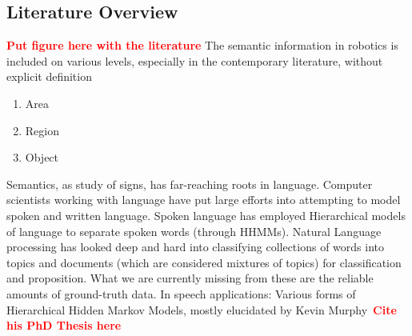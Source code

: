\documentclass[twocolumn,letterpaper]{IEEEAerospaceCLS}  %
\newcommand\todo[1]{\textbf{\textcolor{red}{#1}}}
\begin{document}
\subsection{Literature Overview} \label{ssec:ResLit}
\todo{Put figure here with the literature}
The semantic information in robotics is included on various levels, especially in the contemporary literature, without explicit definition
\begin{enumerate}
    \item Area
    \item Region
    \item Object
\end{enumerate}
Semantics, as study of signs, has far-reaching roots in language. Computer scientists working with language have put large efforts into attempting to model spoken and written language. Spoken language has employed Hierarchical models of language to separate spoken words (through HHMMs). Natural Language processing has looked deep and hard into classifying collections of words into topics and documents (which are considered mixtures of topics) for classification and proposition.
What we are currently missing from these are the reliable amounts of ground-truth data.
In speech applications: Various forms of Hierarchical Hidden Markov Models, mostly elucidated by Kevin Murphy~\todo{Cite his PhD Thesis here}
\end{document}
